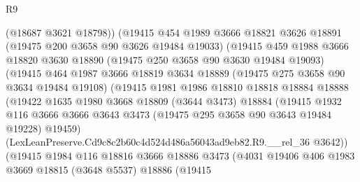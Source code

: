 \begin{lexlean}{R9}
\begin{coremodule}
                        (@18687 @3621 @18798))
                      (@19415
                        @454
                        @1989
                        @3666
                        @18821
                        @3626
                        @18891
                        (@19475 @200 @3658 @90 @3626 @19484 @19033)
                        (@19415
                          @459
                          @1988
                          @3666
                          @18820
                          @3630
                          @18890
                          (@19475 @250 @3658 @90 @3630 @19484 @19093)
                          (@19415
                            @464
                            @1987
                            @3666
                            @18819
                            @3634
                            @18889
                            (@19475 @275 @3658 @90 @3634 @19484 @19108)
                            (@19415
                              @1981
                              @1986
                              @18810
                              @18818
                              @18884
                              @18888
                              (@19422
                                @1635
                                @1980
                                @3668
                                @18809
                                (@3644 @3473)
                                @18884
                                (@19415
                                  @1932
                                  @116
                                  @3666
                                  @3666
                                  @3643
                                  @3473
                                  (@19475 @295 @3658 @90 @3643 @19484 @19228)
                                  @19459)
                                (LexLeanPreserve.Cd9c8c2b60c4d524d486a56043ad9eb82.R9.__rel_36
                                  @3642))
                              (@19415
                                @1984
                                @116
                                @18816
                                @3666
                                @18886
                                @3473
                                (@4031
                                  @19406
                                  @406
                                  @1983
                                  @3669
                                  @18815
                                  (@3648 @5537)
                                  @18886
                                  (@19415

\end{coremodule}
\end{lexlean}
